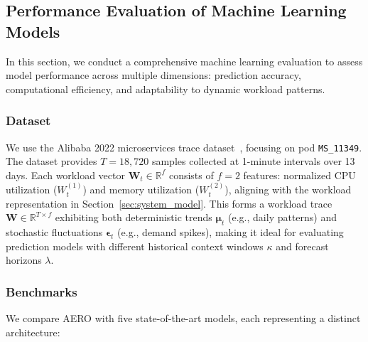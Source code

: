 \documentclass{ieeetmlcn}
\begin{document}
\subsection{Performance Evaluation of Machine Learning Models}
\label{sec:evaluation}

In this section, we conduct a comprehensive machine learning evaluation to assess model performance across multiple dimensions: prediction accuracy, computational efficiency, and adaptability to dynamic workload patterns.

\subsubsection{Dataset}

We use the Alibaba 2022 microservices trace dataset~\cite{luo2022Prediction}, focusing on pod \texttt{MS\_11349}. The dataset provides $T = 18,\!720$ samples collected at 1-minute intervals over 13 days. Each workload vector $\mathbf{W}_t \in \mathbb{R}^{f}$ consists of $f = 2$ features: normalized CPU utilization ($W_t^{(1)}$) and memory utilization ($W_t^{(2)}$), aligning with the workload representation in Section~\ref{sec:system_model}. This forms a workload trace $\mathbf{W} \in \mathbb{R}^{T \times f}$ exhibiting both deterministic trends $\boldsymbol{\mu}_t$ (e.g., daily patterns) and stochastic fluctuations $\boldsymbol{\epsilon}_t$ (e.g., demand spikes), making it ideal for evaluating prediction models with different historical context windows $\kappa$ and forecast horizons $\lambda$.

\subsubsection{Benchmarks}

We compare AERO with five state-of-the-art models, each representing a distinct architecture:
\end{document}
